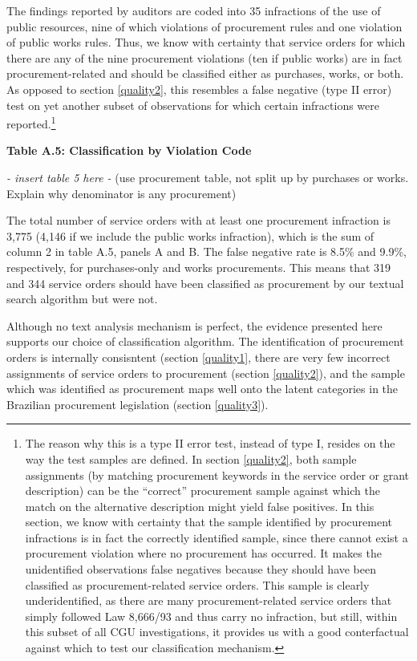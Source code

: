 \documentclass[]{article}
\let\rmarkdownfootnote\footnote%
\def\footnote{\protect\rmarkdownfootnote}
\theoremstyle{definition}
\theoremstyle{definition}
\theoremstyle{definition}
\theoremstyle{remark}
\begin{document}
The findings reported by auditors are coded into 35 infractions of the
use of public resources, nine of which violations of procurement rules
and one violation of public works rules. Thus, we know with certainty
that service orders for which there are any of the nine procurement
violations (ten if public works) are in fact procurement-related and
should be classified either as purchases, works, or both. As opposed to
section \ref{quality2}, this resembles a false negative (type II error)
test on yet another subset of observations for which certain infractions
were reported.\footnote{The reason why this is a type II error test,
  instead of type I, resides on the way the test samples are defined. In
  section \ref{quality2}, both sample assignments (by matching
  procurement keywords in the service order or grant description) can be
  the ``correct'' procurement sample against which the match on the
  alternative description might yield false positives. In this section,
  we know with certainty that the sample identified by procurement
  infractions is in fact the correctly identified sample, since there
  cannot exist a procurement violation where no procurement has
  occurred. It makes the unidentified observations false negatives
  because they should have been classified as procurement-related
  service orders. This sample is clearly underidentified, as there are
  many procurement-related service orders that simply followed Law
  8,666/93 and thus carry no infraction, but still, within this subset
  of all CGU investigations, it provides us with a good conterfactual
  against which to test our classification mechanism.}

\textbf{Table A.5: Classification by Violation Code}

\emph{- insert table 5 here -} (use procurement table, not split up by
purchases or works. Explain why denominator is any procurement)

The total number of service orders with at least one procurement
infraction is 3,775 (4,146 if we include the public works infraction),
which is the sum of column 2 in table A.5, panels A and B. The false
negative rate is 8.5\% and 9.9\%, respectively, for purchases-only and
works procurements. This means that 319 and 344 service orders should
have been classified as procurement by our textual search algorithm but
were not.

Although no text analysis mechanism is perfect, the evidence presented
here supports our choice of classification algorithm. The identification
of procurement orders is internally consisntent (section \ref{quality1},
there are very few incorrect assignments of service orders to
procurement (section \ref{quality2}), and the sample which was
identified as procurement maps well onto the latent categories in the
Brazilian procurement legislation (section \ref{quality3}).
\end{document}
